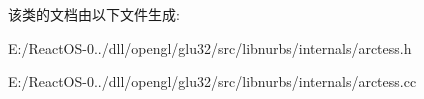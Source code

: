 该类的文档由以下文件生成\+:\begin{DoxyCompactItemize}
\item 
E\+:/\+React\+O\+S-\/0../dll/opengl/glu32/src/libnurbs/internals/arctess.\+h\item 
E\+:/\+React\+O\+S-\/0../dll/opengl/glu32/src/libnurbs/internals/arctess.\+cc\end{DoxyCompactItemize}
